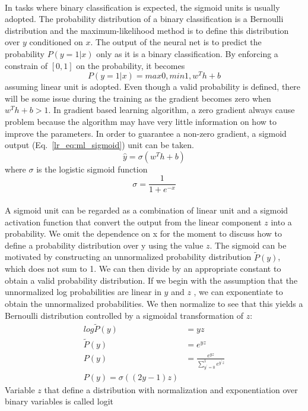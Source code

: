 \paragraph{}
In tasks where binary classification is expected, the sigmoid units is usually adopted.
The probability distribution of a binary classification is a Bernoulli distribution and the maximum-likelihood method is to define this distribution over $y$ conditioned on $x$.
The output of the neural net is to predict the probability $P(y=1|x)$ only as it is a binary classification.
By enforcing a constrain of $[0,1]$ on the probability, it becomes
\begin{equation}
    P(y=1|x) = max{0,min{1, w^T h + b}}
\end{equation}
assuming linear unit is adopted.
Even though a valid probability is defined, there will be some issue during the training as the gradient becomes zero when $w^T h +b>1$.
In gradient based learning algorithm, a zero gradient always cause problem because the algorithm may have very little information on how to improve the parameters.
In order to guarantee a non-zero gradient, a sigmoid output (Eq.~\ref{lr_eq:ml_sigmoid}) unit can be taken.
\begin{equation}
    \hat{y} = \sigma (w^T h +b)
    \label{lr_eq:ml_sigmoid}
\end{equation}
where $\sigma$ is the logistic sigmoid function
\begin{equation}
    \sigma = \frac{1}{1+e^{-x}}
\end{equation}

\paragraph{}
A sigmoid unit can be regarded as a combination of linear unit and a sigmoid activation function that convert the output from the linear component $z$ into a probability.
We omit the dependence on x for the moment to discuss how to define a probability distribution over y using the value $z$.
The sigmoid can be motivated by constructing an unnormalized probability distribution $\tilde{P}(y)$, which does not sum to 1.
We can then divide by an appropriate constant to obtain a valid probability distribution.
If we begin with the assumption that the unnormalized log probabilities are linear in $y$ and $z$ , we can exponentiate to obtain the unnormalized probabilities.
We then normalize to see that this yields a Bernoulli distribution controlled by a sigmoidal transformation of $z$:
\begin{equation}
    \begin{aligned}
        log \tilde{P} (y) &= yz \\
        \tilde{P} (y) &= e^{yz} \\
        P(y) &= \frac{e^{yz}}{\sum_{y^\prime=0}^1 e^{y^\prime z}} \\
        P(y) = \sigma ((2y-1)z)
    \end{aligned}
\end{equation}
Variable $z$ that define a distribution with normalization and exponentiation over binary variables is called logit

